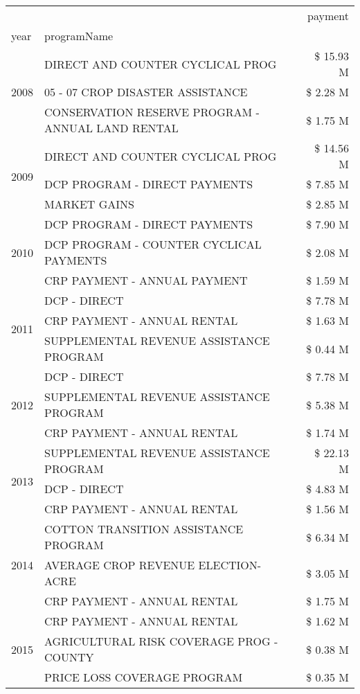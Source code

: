\begin{tabular}{llr}
\toprule
 &  & payment \\
year & programName &  \\
\midrule
\multirow[t]{3}{*}{2008} & DIRECT AND COUNTER CYCLICAL PROG & \$ 15.93 M \\
 & 05 - 07 CROP DISASTER ASSISTANCE & \$ 2.28 M \\
 & CONSERVATION RESERVE PROGRAM - ANNUAL LAND RENTAL & \$ 1.75 M \\
\cline{1-3}
\multirow[t]{3}{*}{2009} & DIRECT AND COUNTER CYCLICAL PROG & \$ 14.56 M \\
 & DCP PROGRAM - DIRECT PAYMENTS & \$ 7.85 M \\
 & MARKET GAINS & \$ 2.85 M \\
\cline{1-3}
\multirow[t]{3}{*}{2010} & DCP PROGRAM - DIRECT PAYMENTS & \$ 7.90 M \\
 & DCP PROGRAM - COUNTER CYCLICAL PAYMENTS & \$ 2.08 M \\
 & CRP PAYMENT - ANNUAL PAYMENT & \$ 1.59 M \\
\cline{1-3}
\multirow[t]{3}{*}{2011} & DCP - DIRECT & \$ 7.78 M \\
 & CRP PAYMENT - ANNUAL RENTAL & \$ 1.63 M \\
 & SUPPLEMENTAL REVENUE ASSISTANCE PROGRAM & \$ 0.44 M \\
\cline{1-3}
\multirow[t]{3}{*}{2012} & DCP - DIRECT & \$ 7.78 M \\
 & SUPPLEMENTAL REVENUE ASSISTANCE PROGRAM & \$ 5.38 M \\
 & CRP PAYMENT - ANNUAL RENTAL & \$ 1.74 M \\
\cline{1-3}
\multirow[t]{3}{*}{2013} & SUPPLEMENTAL REVENUE ASSISTANCE PROGRAM & \$ 22.13 M \\
 & DCP - DIRECT & \$ 4.83 M \\
 & CRP PAYMENT - ANNUAL RENTAL & \$ 1.56 M \\
\cline{1-3}
\multirow[t]{3}{*}{2014} & COTTON TRANSITION ASSISTANCE PROGRAM & \$ 6.34 M \\
 & AVERAGE CROP REVENUE ELECTION-ACRE & \$ 3.05 M \\
 & CRP PAYMENT - ANNUAL RENTAL & \$ 1.75 M \\
\cline{1-3}
\multirow[t]{3}{*}{2015} & CRP PAYMENT - ANNUAL RENTAL & \$ 1.62 M \\
 & AGRICULTURAL RISK COVERAGE PROG - COUNTY & \$ 0.38 M \\
 & PRICE LOSS COVERAGE PROGRAM & \$ 0.35 M \\

\end{tabular}
